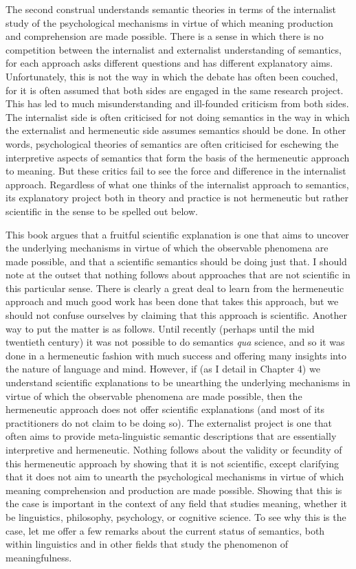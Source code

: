 \begin{refsection}
The second construal understands semantic theories in terms of the internalist study of the psychological mechanisms in virtue of which meaning production and comprehension are made possible. There is a sense in which there is no competition between the internalist and externalist understanding of semantics, for each approach asks different questions and has different explanatory aims. Unfortunately, this is not the way in which the debate has often been couched, for it is often assumed that both sides are engaged in the same research project. This has led to much misunderstanding and ill-founded criticism from both sides. The internalist side is often criticised for not doing semantics in the way in which the externalist and hermeneutic side assumes semantics should be done. In other words, psychological theories of semantics are often criticised for eschewing the interpretive aspects of semantics that form the basis of the hermeneutic approach to meaning. But these critics fail to see the force and difference in the internalist approach. Regardless of what one thinks of the internalist approach to semantics, its explanatory project both in theory and practice is not hermeneutic but rather scientific in the sense to be spelled out below.

This book argues that a fruitful scientific explanation is one that aims to uncover the underlying mechanisms in virtue of which the observable phenomena are made possible, and that a scientific semantics should be doing just that. I should note at the outset that nothing follows about approaches that are not scientific in this particular sense. There is clearly a great deal to learn from the hermeneutic approach and much good work has been done that takes this approach, but we should not confuse ourselves by claiming that this approach is scientific. Another way to put the matter is as follows. Until recently (perhaps until the mid twentieth century) it was not possible to do semantics \textit{qua} science, and so it was done in a hermeneutic fashion with much success and offering many insights into the nature of language and mind. However, if (as I detail in Chapter 4) we understand scientific explanations to be unearthing the underlying mechanisms in virtue of which the observable phenomena are made possible, then the hermeneutic approach does not offer scientific explanations (and most of its practitioners do not claim to be doing so). The externalist project is one that often aims to provide meta-linguistic semantic descriptions that are essentially interpretive and hermeneutic. Nothing follows about the validity or fecundity of this hermeneutic approach by showing that it is not scientific, except clarifying that it does not aim to unearth the psychological mechanisms in virtue of which meaning comprehension and production are made possible. Showing that this is the case is important in the context of any field that studies meaning, whether it be linguistics, philosophy, psychology, or cognitive science. To see why this is the case, let me offer a few remarks about the current status of semantics, both within linguistics and in other fields that study the phenomenon of meaningfulness.


\end{refsection}
